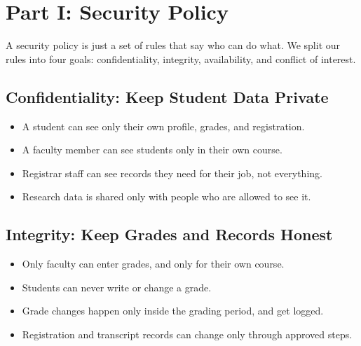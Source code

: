     \tableofcontents
    \thispagestyle{empty}
    \clearpage


    \section{Part I: Security Policy}

        A security policy is just a set of rules that say who can do what. We split our rules into four goals:
        confidentiality, integrity, availability, and conflict of interest.

        \subsection[Confidentiality]{Confidentiality: Keep Student Data Private}

            \begin{itemize}
                \item A student can see only their own profile, grades, and registration.
                \item A faculty member can see students only in their own course.
                \item Registrar staff can see records they need for their job, not everything.
                \item Research data is shared only with people who are allowed to see it.
            \end{itemize}

        \subsection[Integrity]{Integrity: Keep Grades and Records Honest}

            \begin{itemize}
                \item Only faculty can enter grades, and only for their own course.
                \item Students can never write or change a grade.
                \item Grade changes happen only inside the grading period, and get logged.
                \item Registration and transcript records can change only through approved steps.
            \end{itemize}

